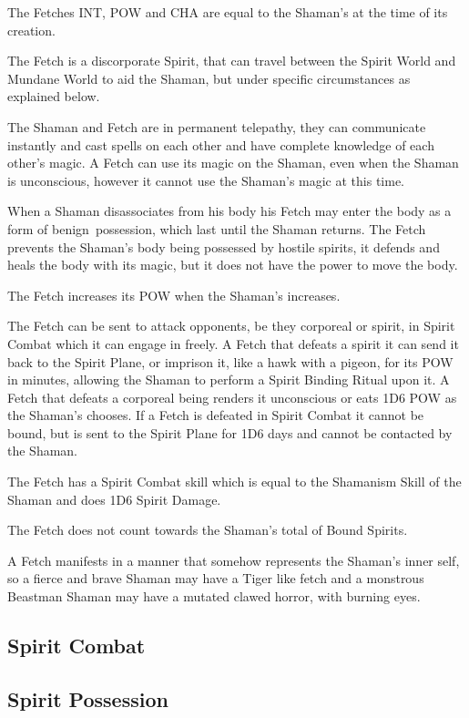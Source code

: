 \begin{rpg-list}
\item The Fetches INT, POW and CHA are equal to the Shaman’s at the time of its creation.
\item The Fetch is a discorporate Spirit, that can travel between the Spirit World and Mundane World to aid the Shaman, but under specific circumstances as explained below.
\item The Shaman and Fetch are in permanent telepathy, they can communicate instantly and cast spells on each other and have complete knowledge of each other’s magic. A Fetch can use its magic on the Shaman, even when the Shaman is unconscious, however it cannot use the Shaman’s magic at this time.
\item When a Shaman disassociates from his body his Fetch may enter the body as a form of benign possession, which last until the Shaman returns. The Fetch prevents the Shaman’s body being possessed by hostile spirits, it defends and heals the body with its magic, but it does not have the power to move the body.
\item The Fetch increases its POW when the Shaman’s increases.
\item The Fetch can be sent to attack opponents, be they corporeal or spirit, in Spirit Combat which it can engage in freely. A Fetch that defeats a spirit it can send it back to the Spirit Plane, or imprison it, like a hawk with a pigeon, for its POW in minutes, allowing the Shaman to perform a Spirit Binding Ritual upon it. A Fetch that defeats a corporeal being renders it unconscious or eats 1D6 POW as the Shaman’s chooses. If a Fetch is defeated in Spirit Combat it cannot be bound, but is sent to the Spirit Plane for 1D6 days and cannot be contacted by the Shaman.
\item The Fetch has a Spirit Combat skill which is equal to the Shamanism Skill of the Shaman and does 1D6 Spirit Damage.
\item The Fetch does not count towards the Shaman’s total of Bound Spirits.
\item A Fetch manifests in a manner that somehow represents the Shaman’s inner self, so a fierce and brave Shaman may have a Tiger like fetch and a monstrous Beastman Shaman may have a mutated clawed horror, with burning eyes.
\end{rpg-list}


\subsection{Spirit Combat}

\subsection{Spirit Possession}


